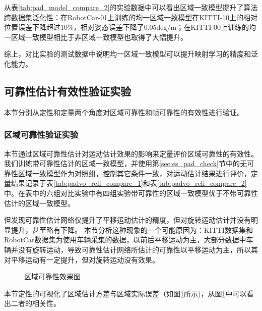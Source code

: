 从表\ref{tab:pad_model_compare_2}的实验数据中可以看出区域一致模型提升了算法跨数据集泛化性：在RobotCar-01上训练的均一区域一致模型在KITTI-10上的相对位置误差下降超过10\%，相对姿态误差下降了0.05deg/m；在KITTI-00上训练的均一区域一致模型相比于非区域一致模型也取得了大幅提升。

综上，对比实验的测试数据中说明均一区域一致模型可以提升映射学习的精度和泛化能力。


\subsection{可靠性估计有效性验证实验}
\label{sec:pad_es_relia}

本节分别从定性和定量两个角度对区域可靠性和帧可靠性的有效性进行验证。
\subsubsection{区域可靠性验证实验}

本节通过区域可靠性估计对运动估计效果的影响来定量评价区域可靠性的有效性。我们训练带可靠性估计的区域一致模型，并使用第\ref{sec:es_pad_check}节中的无可靠性区域一致模型作为对照组，控制其它条件一致，对运动估计结果进行评价，定量结果记录于表\ref{tab:padvo_reli_compare_1}和表\ref{tab:padvo_reli_compare_2}中。在表中的六组对比实验中有四组实验带可靠性的区域一致模型优于不带可靠性估计的区域一致模型。

但发现可靠性估计网络仅提升了平移运动估计的精度，但对旋转运动估计并没有明显提升，甚至略有下降。
本节分析这种现象的一个可能原因为：KITTI数据集和RobotCar数据集为使用车辆采集的数据，以前后平移运动为主，大部分数据中车辆并没有旋转运动，导致可靠性估计网络所估计的可靠性以平移运动为主，所以其对平移运动有一定提升，但对旋转运动没有效果。
\begin{figure}[h]
  \centering
  \vspace*{2mm}
  \vspace*{2mm}
  \vspace*{2mm}
  \vspace*{2mm}
  \caption{区域可靠性效果图}
  \label{fig:pad_pad_reli}
  \end{figure}
本节定性的可视化了区域估计方差与区域实际误差（如图\ref{fig:pad_pad_reli}所示)，从图\ref{fig:pad_pad_reli}中可以看出二者的相关性。

